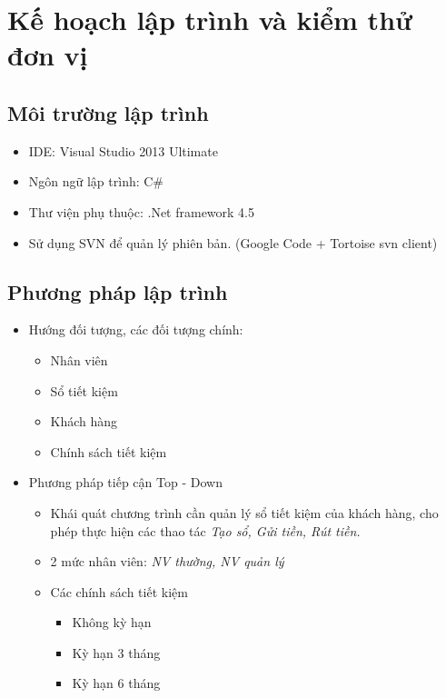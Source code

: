 \documentclass{article}
\begin{document}
		\section{Kế hoạch lập trình và kiểm thử đơn vị}
			\subsection{Môi trường lập trình}
				\begin{itemize}
					\item IDE: Visual Studio 2013 Ultimate
					\item Ngôn ngữ lập trình: C\#
					\item Thư viện phụ thuộc: .Net framework 4.5
					\item Sử dụng SVN để quản lý phiên bản. (Google Code + Tortoise svn client)
				\end{itemize}
				
			\subsection{Phương pháp lập trình}
			
				\begin{itemize}
					\item Hướng đối tượng, các đối tượng chính:
					
						\begin{itemize}
							\item Nhân viên
							\item Sổ tiết kiệm
							\item Khách hàng
							\item Chính sách tiết kiệm
						\end{itemize}
					\item Phương pháp tiếp cận Top - Down
					
						\begin{itemize}
							\item Khái quát chương trình cần quản lý sổ tiết kiệm của khách hàng, cho phép thực hiện các thao tác \textit{Tạo sổ, Gửi tiền, Rút tiền.}
							\item 2 mức nhân viên: \textit{NV thường, NV quản lý}
							\item Các chính sách tiết kiệm
							
								\begin{itemize}
									\item Không kỳ hạn
									\item Kỳ hạn 3 tháng
									\item Kỳ hạn 6 tháng
								\end{itemize}
							
						\end{itemize}
					
				\end{itemize}
			
\end{document}
